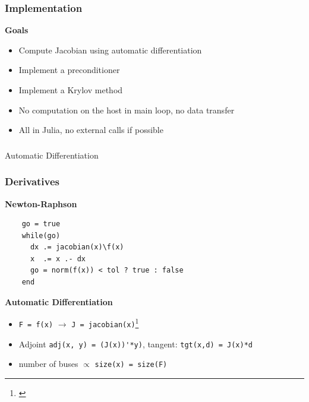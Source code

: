 \begin{frame}
  \frametitle{Implementation}
  {\bf Goals}
  \begin{itemize}
    \item Compute Jacobian using automatic differentiation
    \item Implement a preconditioner
    \item Implement a Krylov method
    \item No computation on the host in main loop, no data transfer
    \item All in Julia, no external calls if possible
  \end{itemize}
\end{frame}

\begin{frame}
  \frametitle{}
  \centering
  {\Huge Automatic Differentiation}
\end{frame}

\begin{frame}[fragile]
  \frametitle{Derivatives}
  {\bf Newton-Raphson}
  \begin{center}
  \begin{minipage}{0.8\textwidth}
    \begin{lstlisting}
    go = true
    while(go)
      dx .= jacobian(x)\f(x)
      x  .= x .- dx
      go = norm(f(x)) < tol ? true : false
    end
    \end{lstlisting}
   \end{minipage}
  \end{center}
  {\bf Automatic Differentiation}
  \begin{itemize}
    \item \lstinline{F = f(x)} $\rightarrow$ \alert{\lstinline{J = jacobian(x)}}\footnote{\cite{RevelsLubinPapamarkou2016}}
    \item {\color{green} Adjoint} \lstinline{adj(x, y) = (J(x))'*y)}, tangent: \lstinline{tgt(x,d) = J(x)*d} 
    \item number of buses $\propto$ \lstinline{size(x) = size(F)}
  \end{itemize}
\end{frame}

